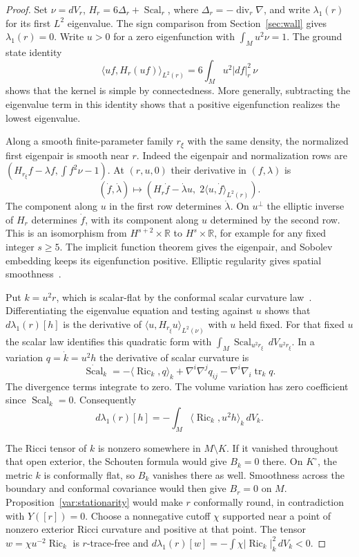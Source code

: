 \documentclass[11pt]{article}
\numberwithin{equation}{section}
\theoremstyle{definition}
\theoremstyle{remark}
\DeclareMathOperator{\Ric}{Ric}
\DeclareMathOperator{\tr}{tr}
\DeclareMathOperator{\Scal}{Scal}
\begin{document}
\begin{proof}
Set \(\nu=dV_r\), \(H_r=6\Delta_r+\Scal_r\), where
\(\Delta_r=-\operatorname{div}_r\nabla\), and write \(\lambda_1(r)\)
for its first \(L^2\) eigenvalue. The sign comparison from
Section~\ref{sec:wall} gives \(\lambda_1(r)=0\). Write \(u>0\)
for a zero eigenfunction with \(\int_M u^2\nu=1\).
The ground state identity
\[
 \langle uf,H_r(uf)\rangle_{L^2(r)}
     =6\int_M u^2|df|_r^2\,\nu
\]
shows that the kernel is simple by connectedness. More generally,
subtracting the eigenvalue term in this identity shows that a
positive eigenfunction realizes the lowest eigenvalue.

Along a smooth finite-parameter family \(r_\xi\) with the same
density, the normalized first eigenpair is smooth near \(r\).
Indeed the eigenpair and normalization rows are
\((H_{r_\xi}f-\lambda f,\int f^2\nu-1)\).
At \((r,u,0)\) their derivative in \((f,\lambda)\) is
\[
 (\dot f,\dot\lambda)\longmapsto
       (H_r\dot f-\dot\lambda u,\;2\langle u,\dot f\rangle_{L^2(r)}).
\]
The component along \(u\) in the first row determines
\(\dot\lambda\). On \(u^\perp\) the elliptic inverse of \(H_r\)
determines \(\dot f\), with its component along \(u\) determined by
the second row. This is an isomorphism from \(H^{s+2}\times\mathbb R\)
to \(H^s\times\mathbb R\), for example for any fixed integer
\(s\ge5\). The implicit function theorem gives the eigenpair, and
Sobolev embedding keeps its eigenfunction positive. Elliptic
regularity gives spatial smoothness~\cite[(1)--(2)]{Melrose2017Lecture22}.

Put \(k=u^2r\), which is scalar-flat by the conformal scalar
curvature law~\cite[(2.6)--(2.7)]{LeeParker1987Yamabe}.
Differentiating the eigenvalue equation and testing against \(u\)
shows that \(d\lambda_1(r)[h]\) is the derivative of
\(\langle u,H_{r_\xi}u\rangle_{L^2(\nu)}\) with \(u\) held fixed.
For that fixed \(u\) the scalar law identifies this quadratic form
with \(\int_M\Scal_{u^2r_\xi}\,dV_{u^2r_\xi}\). In a variation
\(q=\dot k=u^2h\) the derivative of scalar curvature is
\[
 \dot{\Scal}_k=-\langle\Ric_k,q\rangle_k
          +\nabla^i\nabla^j q_{ij}
          -\nabla^i\nabla_i\tr_k q .
\]
The divergence terms integrate to zero. The volume variation has
zero coefficient since \(\Scal_k=0\). Consequently
\begin{equation}\label{mscost:eigenvariation}
 d\lambda_1(r)[h]=-\int_M\langle\Ric_k,u^2h\rangle_k\,dV_k .
\end{equation}

The Ricci tensor of \(k\) is nonzero somewhere in \(M\setminus K\).
If it vanished throughout that open exterior, the Schouten formula
would give \(B_k=0\) there. On \(K^\circ\), the metric \(k\) is
conformally flat, so \(B_k\) vanishes there as well. Smoothness
across the boundary and conformal covariance would then give
\(B_r=0\) on \(M\). Proposition~\ref{var:stationarity} would make
\(r\) conformally round, in contradiction with \(Y([r])=0\).
Choose a nonnegative cutoff \(\chi\) supported near a point of
nonzero exterior Ricci curvature and positive at that point.
The tensor \(w=\chi u^{-2}\Ric_k\) is \(r\)-trace-free and
\(d\lambda_1(r)[w]=-\int\chi|\Ric_k|_k^2\,dV_k<0\).


\end{proof}
\end{document}
